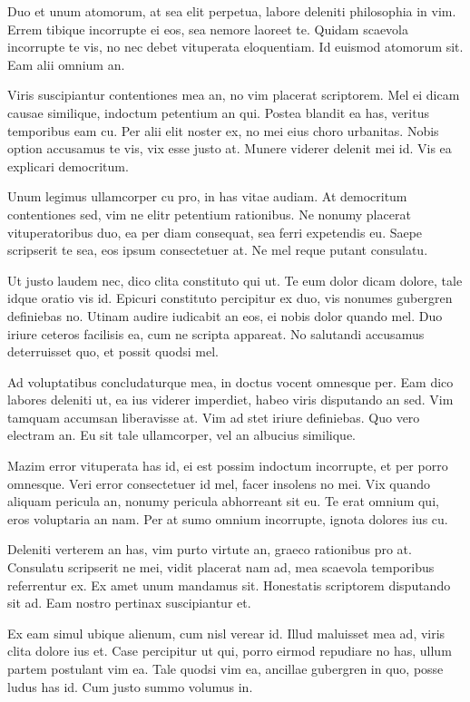 \documentclass[twocolumn,twoside]{IEEEtran}
\begin{document}
 Duo et unum atomorum, at sea elit perpetua, labore deleniti philosophia in
 vim. Errem tibique incorrupte ei eos, sea nemore laoreet te. Quidam scaevola
 incorrupte te vis, no nec debet vituperata eloquentiam. Id euismod atomorum
 sit. Eam alii omnium an.

 Viris suscipiantur contentiones mea an, no vim placerat scriptorem. Mel ei
 dicam causae similique, indoctum petentium an qui. Postea blandit ea has,
 veritus temporibus eam cu. Per alii elit noster ex, no mei eius choro
 urbanitas. Nobis option accusamus te vis, vix esse justo at. Munere viderer
 delenit mei id. Vis ea explicari democritum.

 Unum legimus ullamcorper cu pro, in has vitae audiam. At democritum
 contentiones sed, vim ne elitr petentium rationibus. Ne nonumy placerat
 vituperatoribus duo, ea per diam consequat, sea ferri expetendis eu. Saepe
 scripserit te sea, eos ipsum consectetuer at. Ne mel reque putant consulatu.

 Ut justo laudem nec, dico clita constituto qui ut. Te eum dolor dicam dolore,
 tale idque oratio vis id. Epicuri constituto percipitur ex duo, vis nonumes
 gubergren definiebas no. Utinam audire iudicabit an eos, ei nobis dolor quando
 mel. Duo iriure ceteros facilisis ea, cum ne scripta appareat. No salutandi
 accusamus deterruisset quo, et possit quodsi mel.

 Ad voluptatibus concludaturque mea, in doctus vocent omnesque per. Eam dico
 labores deleniti ut, ea ius viderer imperdiet, habeo viris disputando an sed.
 Vim tamquam accumsan liberavisse at. Vim ad stet iriure definiebas. Quo vero
 electram an. Eu sit tale ullamcorper, vel an albucius similique.

 Mazim error vituperata has id, ei est possim indoctum incorrupte, et per porro
 omnesque. Veri error consectetuer id mel, facer insolens no mei. Vix quando
 aliquam pericula an, nonumy pericula abhorreant sit eu. Te erat omnium qui,
 eros voluptaria an nam. Per at sumo omnium incorrupte, ignota dolores ius cu.

 Deleniti verterem an has, vim purto virtute an, graeco rationibus pro at.
 Consulatu scripserit ne mei, vidit placerat nam ad, mea scaevola temporibus
 referrentur ex. Ex amet unum mandamus sit. Honestatis scriptorem disputando
 sit ad. Eam nostro pertinax suscipiantur et.

 Ex eam simul ubique alienum, cum nisl verear id. Illud maluisset mea ad, viris
 clita dolore ius et. Case percipitur ut qui, porro eirmod repudiare no has,
 ullum partem postulant vim ea. Tale quodsi vim ea, ancillae gubergren in quo,
 posse ludus has id. Cum justo summo volumus in.
\end{document}
